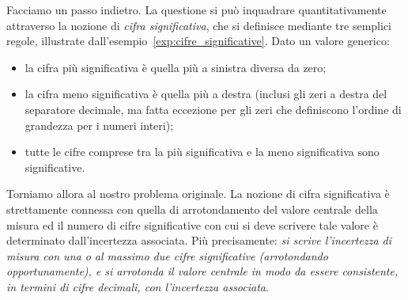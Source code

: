 Facciamo un passo indietro. La questione si può inquadrare quantitativamente
attraverso la nozione di \emph{cifra significativa}, che si definisce mediante
tre semplici regole, illustrate dall'esempio~\ref{exp:cifre_significative}.
Dato un valore generico:
\begin{itemize}
\item la cifra più significativa è quella più a sinistra diversa
  da zero;
\item la cifra meno significativa è quella più a destra (inclusi gli
  zeri a destra del separatore decimale, ma fatta eccezione per gli zeri che
  definiscono l'ordine di grandezza per i numeri interi);
\item tutte le cifre comprese tra la più significativa e la
  meno significativa sono significative.
\end{itemize}

\begin{examplebox}
\end{examplebox}

Torniamo allora al nostro problema originale. La nozione di cifra significativa
è strettamente connessa con quella di arrotondamento del valore centrale
della misura ed il numero di cifre significative con cui si deve scrivere tale
valore è determinato dall'incertezza associata. Più precisamente:
\emph{si scrive l'incertezza di misura con una o al massimo due cifre
  significative (arrotondando opportunamente), e si arrotonda il valore
  centrale in modo da essere consistente, in termini di cifre decimali, con
  l'incertezza associata}.

